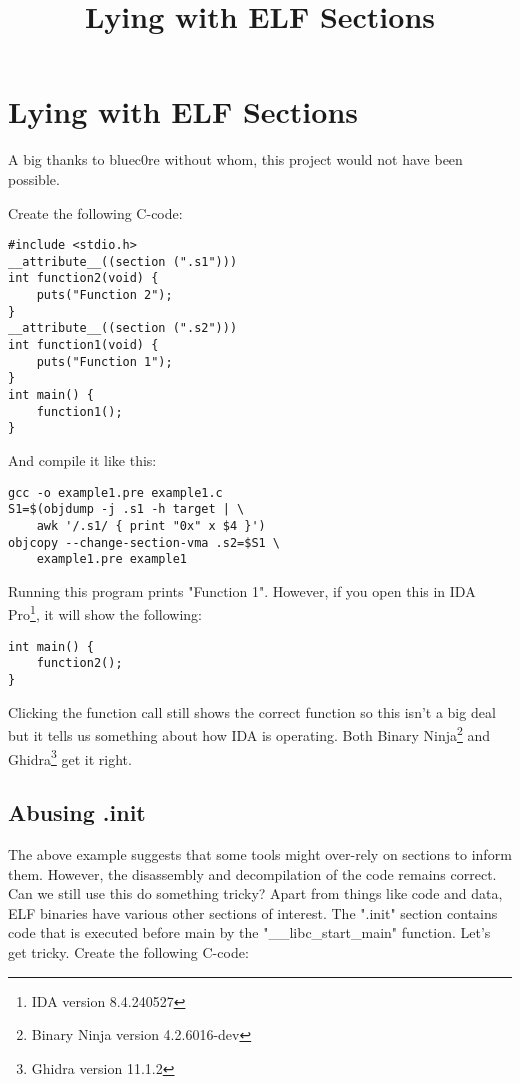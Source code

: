 \documentclass[twocolumn]{article}
\begin{document}
\title{Lying with ELF Sections}
\date{}

\section*{Lying with ELF Sections}
\vspace*{-0.5\baselineskip}

A big thanks to bluec0re without whom, this project would not have been possible. 

Create the following C-code:

\begin{verbatim}
#include <stdio.h>
__attribute__((section (".s1")))
int function2(void) {
    puts("Function 2");
}
__attribute__((section (".s2")))
int function1(void) {
    puts("Function 1");
}
int main() {
    function1();
}
\end{verbatim}

And compile it like this:

\begin{verbatim}
gcc -o example1.pre example1.c 
S1=$(objdump -j .s1 -h target | \
    awk '/.s1/ { print "0x" x $4 }')
objcopy --change-section-vma .s2=$S1 \
    example1.pre example1
\end{verbatim}

Running this program prints "Function 1". However, if you open this in IDA Pro\footnote{IDA version 8.4.240527}, it will show the following:

\begin{verbatim}
int main() {
    function2();
}
\end{verbatim}

Clicking the function call still shows the correct function so this isn't a big deal but it tells us something about how IDA is operating. Both Binary Ninja\footnote{Binary Ninja version 4.2.6016-dev} and Ghidra\footnote{Ghidra version 11.1.2} get it right.

\vspace*{-0.5\baselineskip}
\subsection*{Abusing .init}

The above example suggests that some tools might over-rely on sections to inform them. However, the disassembly and decompilation of the code remains correct. Can we still use this do something tricky? Apart from things like code and data, ELF binaries have various other sections of interest. The ".init" section contains code that is executed before main by the "\_\_libc\_start\_main" function. Let's get tricky. Create the following C-code:
\end{document}
